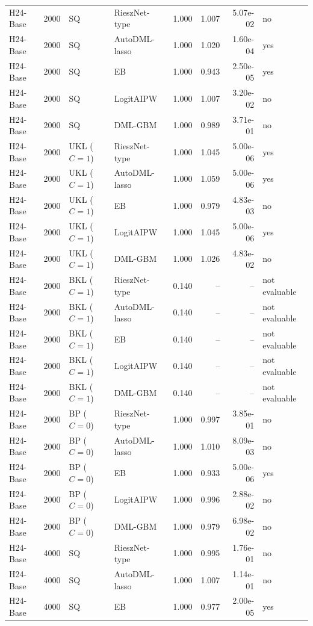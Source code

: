 \begin{tabular}{lrllrrrl}
H24-Base & 2000 & SQ & RieszNet-type & 1.000 & 1.007 & 5.07e-02 & no \\
H24-Base & 2000 & SQ & AutoDML-lasso & 1.000 & 1.020 & 1.60e-04 & yes \\
H24-Base & 2000 & SQ & EB & 1.000 & 0.943 & 2.50e-05 & yes \\
H24-Base & 2000 & SQ & LogitAIPW & 1.000 & 1.007 & 3.20e-02 & no \\
H24-Base & 2000 & SQ & DML-GBM & 1.000 & 0.989 & 3.71e-01 & no \\
H24-Base & 2000 & UKL ($C=1$) & RieszNet-type & 1.000 & 1.045 & 5.00e-06 & yes \\
H24-Base & 2000 & UKL ($C=1$) & AutoDML-lasso & 1.000 & 1.059 & 5.00e-06 & yes \\
H24-Base & 2000 & UKL ($C=1$) & EB & 1.000 & 0.979 & 4.83e-03 & no \\
H24-Base & 2000 & UKL ($C=1$) & LogitAIPW & 1.000 & 1.045 & 5.00e-06 & yes \\
H24-Base & 2000 & UKL ($C=1$) & DML-GBM & 1.000 & 1.026 & 4.83e-02 & no \\
H24-Base & 2000 & BKL ($C=1$) & RieszNet-type & 0.140 & -- & -- & not evaluable \\
H24-Base & 2000 & BKL ($C=1$) & AutoDML-lasso & 0.140 & -- & -- & not evaluable \\
H24-Base & 2000 & BKL ($C=1$) & EB & 0.140 & -- & -- & not evaluable \\
H24-Base & 2000 & BKL ($C=1$) & LogitAIPW & 0.140 & -- & -- & not evaluable \\
H24-Base & 2000 & BKL ($C=1$) & DML-GBM & 0.140 & -- & -- & not evaluable \\
H24-Base & 2000 & BP ($C=0$) & RieszNet-type & 1.000 & 0.997 & 3.85e-01 & no \\
H24-Base & 2000 & BP ($C=0$) & AutoDML-lasso & 1.000 & 1.010 & 8.09e-03 & no \\
H24-Base & 2000 & BP ($C=0$) & EB & 1.000 & 0.933 & 5.00e-06 & yes \\
H24-Base & 2000 & BP ($C=0$) & LogitAIPW & 1.000 & 0.996 & 2.88e-02 & no \\
H24-Base & 2000 & BP ($C=0$) & DML-GBM & 1.000 & 0.979 & 6.98e-02 & no \\
H24-Base & 4000 & SQ & RieszNet-type & 1.000 & 0.995 & 1.76e-01 & no \\
H24-Base & 4000 & SQ & AutoDML-lasso & 1.000 & 1.007 & 1.14e-01 & no \\
H24-Base & 4000 & SQ & EB & 1.000 & 0.977 & 2.00e-05 & yes \\

\end{tabular}
